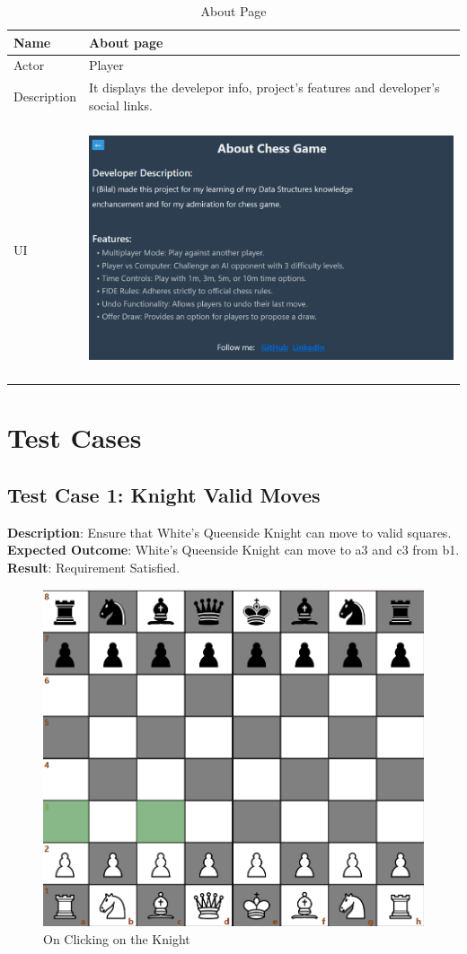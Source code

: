 \documentclass[a4paper,12pt]{article}
\begin{document}
\begin{longtable}{|m{}|m{}|}
    \caption{About Page} \\
    \hline
    Name & About page \\
    \hline
    Actor & Player \\
    \hline
    Description & It displays the develepor info, project's features and developer's social links. \\ 
    \hline
    \centering UI & 
    \begin{center}
        \includegraphics[height=2.7in]{Images/Use Cases/aboutPage.png}
    \end{center} \\ 
    \hline
\end{longtable}

\section{Test Cases}

\subsection{Test Case 1: Knight Valid Moves}
\textbf{Description}: Ensure that White's Queenside Knight can move to valid squares.\\
\textbf{Expected Outcome}: White's Queenside Knight can move to a3 and c3 from b1.\\
\textbf{Result}: Requirement Satisfied.

\begin{figure}[H]
    \centering
    \includegraphics[width=0.7\linewidth]{Images/Test Cases/testCase1Img1.png}
    \caption{On Clicking on the Knight}
    \label{fig:BeforeKnightMove}
\end{figure}
\end{document}
